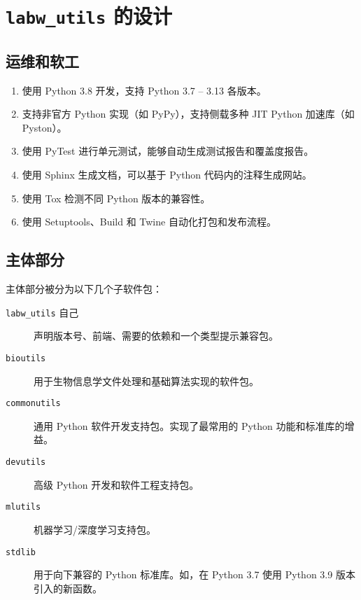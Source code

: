 \documentclass[pdf,9pt]{beamer}
\newcommand{\lu}{\texttt{labw\_utils}}
\begin{document}
    \section{\lu{} 的设计}

    \begin{frame}
        \sectionpage
    \end{frame}

    \subsection{运维和软工}

    \begin{frame}{\subsecname}
        \begin{enumerate}
            \item 使用 Python 3.8 开发，支持 Python 3.7 -- 3.13 各版本。
            \item 支持非官方 Python 实现（如 PyPy），支持侧载多种 JIT Python 加速库（如 Pyston）。
            \item 使用 PyTest 进行单元测试，能够自动生成测试报告和覆盖度报告。
            \item 使用 Sphinx 生成文档，可以基于 Python 代码内的注释生成网站。
            \item 使用 Tox 检测不同 Python 版本的兼容性。
            \item 使用 Setuptools、Build 和 Twine 自动化打包和发布流程。
        \end{enumerate}
    \end{frame}

    \subsection{主体部分}

    \begin{frame}{\subsecname}
        主体部分被分为以下几个子软件包：
        \begin{description}
            \item[\Verb|labw_utils| 自己] 声明版本号、前端、需要的依赖和一个类型提示兼容包。
            \item[\Verb|bioutils|] 用于生物信息学文件处理和基础算法实现的软件包。
            \item[\Verb|commonutils|] 通用 Python 软件开发支持包。实现了最常用的 Python 功能和标准库的增益。
            \item[\Verb|devutils|] 高级 Python 开发和软件工程支持包。
            \item[\Verb|mlutils|] 机器学习/深度学习支持包。
            \item[\Verb|stdlib|] 用于向下兼容的 Python 标准库。如，在 Python 3.7 使用 Python 3.9 版本引入的新函数。
        \end{description}
    \end{frame}
\end{document}
